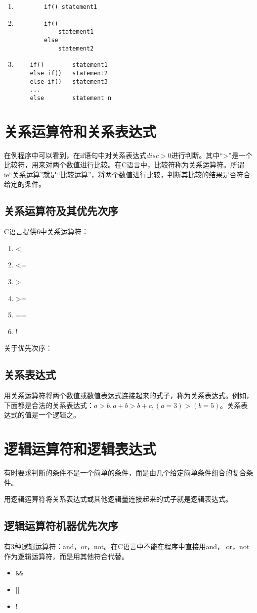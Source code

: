\begin{enumerate}
	\item \begin{lstlisting}
		if() statement1
		\end{lstlisting}
	\item \begin{lstlisting}
		if()
			statement1
		else
			statement2
	\end{lstlisting}
	\item \begin{lstlisting}
	if()		statement1
	else if()	statement2
	else if()	statement3
	... 
	else		statement n
	\end{lstlisting}
\end{enumerate}
\section{关系运算符和关系表达式}
在例程序中可以看到，在if语句中对关系表达式$disc>0$进行判断。其中“>”是一个比较符，用来对两个数值进行比较。在C语言中，比较符称为关系运算符。所谓ie“关系运算”就是“比较运算”，将两个数值进行比较，判断其比较的结果是否符合给定的条件。
\subsection{关系运算符及其优先次序}
C语言提供6中关系运算符：
\begin{enumerate}
	\item <
	\item <=
	\item >
	\item >=
	\item ==
	\item !=
\end{enumerate}
关于优先次序：
\subsection{关系表达式}
用关系运算符将两个数值或数值表达式连接起来的式子，称为关系表达式。例如，下面都是合法的关系表达式：$a > b, a + b > b + c, (a = 3) > ( b = 5)$。关系表达式的值是一个逻辑之。
\section{逻辑运算符和逻辑表达式}
有时要求判断的条件不是一个简单的条件，而是由几个给定简单条件组合的复合条件。

用逻辑运算符将关系表达式或其他逻辑量连接起来的式子就是逻辑表达式。
\subsection{逻辑运算符机器优先次序}
有3种逻辑运算符：and，or，not。在C语言中不能在程序中直接用and， or，not作为逻辑运算符，而是用其他符合代替。
\begin{itemize}
	\item \verb|&&|
	\item ||
	\item !
\end{itemize}
